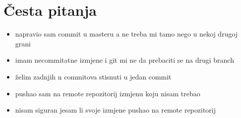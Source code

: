 \chapter*{Česta pitanja}

\begin{itemize}
    \item napravio sam commit u masteru a ne treba mi tamo nego u nekoj drugoj grani
    \item imam necommitatne izmjene i git mi ne da prebaciti se na drugi branch
    \item želim zadnjih n commitova stisnuti u jedan commit
    \item pushao sam na remote repozitorij izmjenu koju nisam trebao
    \item nisam siguran jesam li svoje izmjene pushao na remote repozitorij
\end{itemize}
